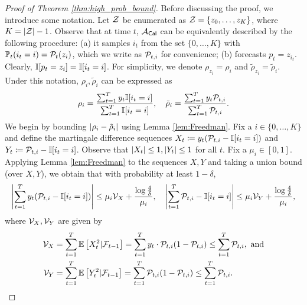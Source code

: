 \begin{proof}[Proof of Theorem \ref{thm:high_prob_bound}]
    Before discussing the proof, we introduce some notation. Let $\mathcal{Z}$ be enumerated as $\mathcal{Z} = \{z_{0}, \dots, z_{K}\}$, where $K = \left\lvert\mathcal{Z}\right\rvert - 1$. Observe that at time $t$, $\mathcal{A}_{\mathsf{Cal}}$ can be equivalently described by the following procedure: (a) it samples $i_{t}$ from the set $\{0, \dots, K\}$ with $\mathbb{P}_{t}(i_{t} = i) = \mathcal{P}_{t}(z_{i})$, which we write as $\mathcal{P}_{t, i}$ for convenience; (b) forecasts $p_{t} = z_{i_{t}}$.
Clearly, $\mathbb{I}{\left[p_{t} = z_{i}\right]} = \mathbb{I}{\left[i_{t} = i\right]}$. For simplicity, we denote $\rho_{z_{i}} = \rho_{i}$ and $\tilde{\rho}_{z_{i}} = \tilde{\rho}_{i}$. Under this notation, $\rho_{i}, \tilde{\rho}_i$ can be expressed as \begin{align*}
    \rho_{i} = \frac{\sum_{t = 1} ^ {T} y_{t} \mathbb{I}{\left[i_{t} = i\right]}}{\sum_{t = 1} ^ {T} \mathbb{I}{\left[i_{t} = i\right]}}, \quad \tilde{\rho}_{i} = \frac{\sum_{t = 1} ^ {T} y_{t} \mathcal{P}_{t, i}}{\sum_{t = 1} ^ {T} \mathcal{P}_{t, i}}.
\end{align*} 
We begin by bounding $\left\lvert\rho_{i} - \tilde{\rho}_{i}\right\rvert$ using Lemma \ref{lem:Freedman}. Fix a $i \in \{0, \dots, K\}$ and define the martingale difference sequences $X_{t} \coloneqq y_{t} (\mathcal{P}_{t, i} - \mathbb{I}{\left[i_{t} = i\right]})$ and $Y_{t} \coloneqq \mathcal{P}_{t, i} - \mathbb{I}{\left[i_{t} = i\right]}$. Observe that $\left\lvert X_{t}\right\rvert \le 1, \left\lvert Y_{t}\right\rvert \le 1$ for all $t$. Fix a $\mu_{i} \in [0, 1]$. Applying Lemma \ref{lem:Freedman} to the sequences $X, Y$ and taking a union bound (over $X, Y$), we obtain that with probability at least $1 - \delta$,\begin{align}\label{eq:bounding_X_and_Y}
    \left\lvert\sum_{t = 1} ^ {T} y_{t}(\mathcal{P}_{t, i} - \mathbb{I}{\left[i_{t} = i\right]})\right\rvert \le \mu_{i} \mathcal{V}_{X} + \frac{\log \frac{4}{\delta}}{\mu_{i}}, \quad \left\lvert\sum_{t = 1} ^ {T} \mathcal{P}_{t, i} - \mathbb{I}{\left[i_{t} = i\right]}\right\rvert \le \mu_{i}\mathcal{V}_{Y} + \frac{\log \frac{4}{\delta}}{\mu_{i}},
\end{align}
where $\mathcal{V}_{X}, \mathcal{V}_{Y}$ are given by \begin{align*}
    \mathcal{V}_{X} &= \sum_{t = 1} ^ {T} \mathbb{E}\left[ X_{t} ^ 2 | \mathcal{F}_{t - 1} \right] = \sum_{t = 1} ^ {T} y_{t} \cdot \mathcal{P}_{t, i} (1 - \mathcal{P}_{t, i}) \le \sum_{t = 1} ^ {T} \mathcal{P}_{t, i}, \text{\,\,and} \\
    \mathcal{V}_{Y} &= \sum_{t = 1} ^ {T} \mathbb{E}\left[ Y_{t} ^ 2 | \mathcal{F}_{t - 1} \right] = \sum_{t = 1} ^ {T} \mathcal{P}_{t, i} (1 - \mathcal{P}_{t, i}) \le \sum_{t = 1} ^ {T} \mathcal{P}_{t, i}.\end{align*}
    

\end{proof}
